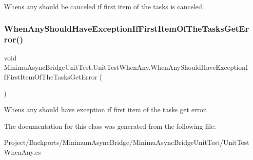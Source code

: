 Whens any should be canceled if first item of the tasks is canceled. 

\mbox{\label{class_minimu_async_bridge_unit_test_1_1_unit_test_when_any_a4d62e663384162142fa3fdcf8ee49a0b}} 
\subsubsection{\texorpdfstring{When\+Any\+Should\+Have\+Exception\+If\+First\+Item\+Of\+The\+Tasks\+Get\+Error()}{WhenAnyShouldHaveExceptionIfFirstItemOfTheTasksGetError()}}
{\footnotesize\ttfamily void Minimu\+Async\+Bridge\+Unit\+Test.\+Unit\+Test\+When\+Any.\+When\+Any\+Should\+Have\+Exception\+If\+First\+Item\+Of\+The\+Tasks\+Get\+Error (\begin{DoxyParamCaption}{ }\end{DoxyParamCaption})\hspace{0.3cm}{\ttfamily [inline]}}



Whens any should have exception if first item of the tasks get error. 



The documentation for this class was generated from the following file\+:\begin{DoxyCompactItemize}
\item 
Project/\+Backports/\+Minimum\+Async\+Bridge/\+Minimu\+Async\+Bridge\+Unit\+Test/Unit\+Test\+When\+Any.\+cs\end{DoxyCompactItemize}
